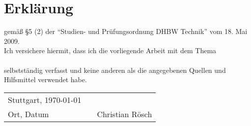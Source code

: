 \chapter*{Erklärung}
\begin{flushleft}
gemäß \S 5 (2) der "`Studien- und Prüfungsordnung DHBW Technik"' vom 18. Mai 2009.\\

Ich versichere hiermit, dass ich die vorliegende Arbeit mit dem Thema\\
\vspace{10mm}\thema\\\vspace{10mm}
selbstständig verfasst und keine anderen als die angegebenen Quellen und Hilfsmittel verwendet habe.\\
\vspace{30mm}
\begin{tabular}{lp{15mm}p{70mm}}
	Stuttgart, \today && \\\cline{1-1}\cline{3-3}
	{\footnotesize Ort, Datum} && {\footnotesize Christian Rösch} \\
\end{tabular}
\end{flushleft}
